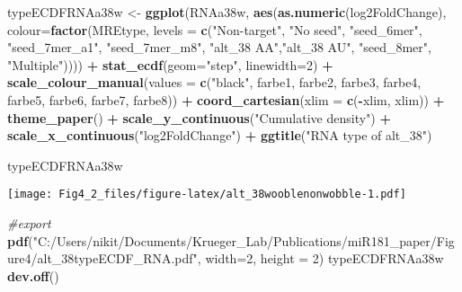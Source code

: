 \documentclass[
]{article}
\newenvironment{Shaded}{\begin{snugshade}}{\end{snugshade}}
\newcommand{\AttributeTok}[1]{\textcolor[rgb]{0.13,0.29,0.53}{#1}}
\newcommand{\CommentTok}[1]{\textcolor[rgb]{0.56,0.35,0.01}{\textit{#1}}}
\newcommand{\DecValTok}[1]{\textcolor[rgb]{0.00,0.00,0.81}{#1}}
\newcommand{\FunctionTok}[1]{\textcolor[rgb]{0.13,0.29,0.53}{\textbf{#1}}}
\newcommand{\NormalTok}[1]{#1}
\newcommand{\OtherTok}[1]{\textcolor[rgb]{0.56,0.35,0.01}{#1}}
\newcommand{\SpecialCharTok}[1]{\textcolor[rgb]{0.81,0.36,0.00}{\textbf{#1}}}
\newcommand{\StringTok}[1]{\textcolor[rgb]{0.31,0.60,0.02}{#1}}
\begin{document}
\begin{Shaded}
\begin{Highlighting}[]
\NormalTok{typeECDFRNAa38w }\OtherTok{\textless{}{-}} \FunctionTok{ggplot}\NormalTok{(RNAa38w, }\FunctionTok{aes}\NormalTok{(}\FunctionTok{as.numeric}\NormalTok{(log2FoldChange), }
                              \AttributeTok{colour=}\FunctionTok{factor}\NormalTok{(MREtype, }\AttributeTok{levels =} \FunctionTok{c}\NormalTok{(}\StringTok{"Non{-}target"}\NormalTok{, }\StringTok{"No seed"}\NormalTok{, }\StringTok{"seed\_6mer"}\NormalTok{, }\StringTok{"seed\_7mer\_a1"}\NormalTok{, }\StringTok{"seed\_7mer\_m8"}\NormalTok{, }\StringTok{"alt\_38 AA"}\NormalTok{,}\StringTok{"alt\_38 AU"}\NormalTok{, }\StringTok{"seed\_8mer"}\NormalTok{, }\StringTok{"Multiple"}\NormalTok{)))) }\SpecialCharTok{+} 
  \FunctionTok{stat\_ecdf}\NormalTok{(}\AttributeTok{geom=}\StringTok{"step"}\NormalTok{, }\AttributeTok{linewidth=}\DecValTok{2}\NormalTok{) }\SpecialCharTok{+}
  \FunctionTok{scale\_colour\_manual}\NormalTok{(}\AttributeTok{values =} \FunctionTok{c}\NormalTok{(}\StringTok{"black"}\NormalTok{, farbe1, farbe2, farbe3, farbe4, farbe5, farbe6, farbe7, farbe8)) }\SpecialCharTok{+}
  \FunctionTok{coord\_cartesian}\NormalTok{(}\AttributeTok{xlim =} \FunctionTok{c}\NormalTok{(}\SpecialCharTok{{-}}\NormalTok{xlim, xlim)) }\SpecialCharTok{+} 
  \FunctionTok{theme\_paper}\NormalTok{() }\SpecialCharTok{+}
  \FunctionTok{scale\_y\_continuous}\NormalTok{(}\StringTok{"Cumulative density"}\NormalTok{) }\SpecialCharTok{+} \FunctionTok{scale\_x\_continuous}\NormalTok{(}\StringTok{"log2FoldChange"}\NormalTok{) }\SpecialCharTok{+}
  \FunctionTok{ggtitle}\NormalTok{(}\StringTok{"RNA type of alt\_38"}\NormalTok{)}

\NormalTok{typeECDFRNAa38w}
\end{Highlighting}
\end{Shaded}

\texttt{[image: Fig4\_2\_files/figure-latex/alt\_38wooblenonwobble-1.pdf]}

\begin{Shaded}
\begin{Highlighting}[]
\CommentTok{\#export}
\FunctionTok{pdf}\NormalTok{(}\StringTok{"C:/Users/nikit/Documents/Krueger\_Lab/Publications/miR181\_paper/Figure4/alt\_38typeECDF\_RNA.pdf"}\NormalTok{, }\AttributeTok{width=}\DecValTok{2}\NormalTok{, }\AttributeTok{height =} \DecValTok{2}\NormalTok{)}
\NormalTok{typeECDFRNAa38w}
\FunctionTok{dev.off}\NormalTok{()}
\end{Highlighting}
\end{Shaded}
\end{document}
